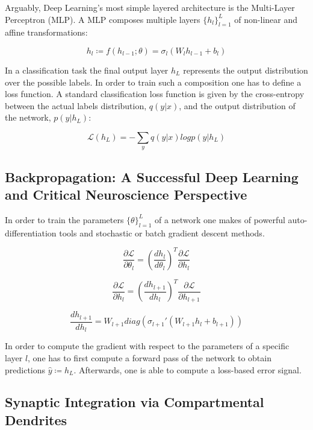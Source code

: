 \documentclass[colorinlistoftodos]{article}
\theoremstyle{definition}
\begin{document}
Arguably, Deep Learning's most simple layered architecture is the Multi-Layer Perceptron (MLP). A MLP composes multiple layers $\{h_l\}_{l=1}^L$ of non-linear and affine transformations:

$$h_l \coloneqq f(h_{l-1}; \theta) = \sigma_l (W_l h_{l-1} + b_l)$$ 

In a classification task the final output layer $h_L$ represents the output distribution over the possible labels. In order to train such a composition one has to define a loss function. A standard classification loss function is given by the cross-entropy between the actual labels distribution, $q(y|x)$, and the output distribution of the network, $p(y|h_L)$:

$$\mathcal{L}(h_L) = - \sum_y q(y|x) log p(y|h_L)$$

\subsection*{Backpropagation: A Successful Deep Learning and Critical Neuroscience Perspective}

In order to train the parameters $\{\theta\}_{l=1}^L$ of a network one makes of powerful auto-differentiation tools and stochastic or batch gradient descent methods.

\begin{equation}
	\frac{\partial \mathcal{L}}{\partial \theta_l} = \left(\frac{dh_{l}}{d \theta_{l}}\right)^T \frac{\partial \mathcal{L}}{\partial h_{l}}
\end{equation}

\begin{equation}
	\frac{\partial \mathcal{L}}{\partial h_l} = \left(\frac{dh_{l+1}}{d h_{l}}\right)^T \frac{\partial \mathcal{L}}{\partial h_{l+1}}
\end{equation}

\begin{equation}
	\frac{dh_{l+1}}{dh_l} = W_{l+1} diag\left(\sigma_{l+1}'(W_{l+1}h_l +b_{l+1})\right)
\end{equation}

In order to compute the gradient with respect to the parameters of a specific layer $l$, one has to first compute a forward pass of the network to obtain predictions $\hat{y} \coloneqq h_L$. Afterwards, one is able to compute a loss-based error signal. 


\subsection*{Synaptic Integration via Compartmental Dendrites}
\end{document}
